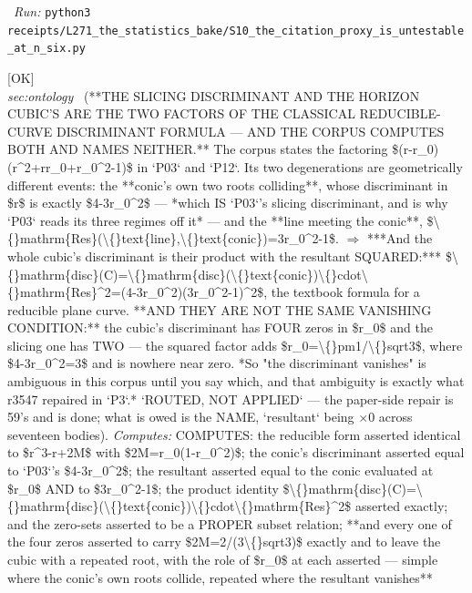 \begin{description}
\ \emph{Run:} \texttt{python3 receipts/L271\_the\_statistics\_bake/S10\_the\_citation\_proxy\_is\_untestable\_at\_n\_six.py}
\item[\label{rcpt:AG1_the_two_discriminants_are_a_resultant_apart}\texttt{AG1\_the\_two\_discriminants\_are\_a\_resultant\_apart}]\hfill\textsf{[OK]}\\
\textit{sec:ontology} \ (**THE SLICING DISCRIMINANT AND THE HORIZON CUBIC'S ARE THE TWO FACTORS OF THE CLASSICAL REDUCIBLE-CURVE DISCRIMINANT FORMULA --- AND THE CORPUS COMPUTES BOTH AND NAMES NEITHER.** The corpus states the factoring \$(r-r\_0)(r\textasciicircum{}2+rr\_0+r\_0\textasciicircum{}2-1)\$ in `P03` and `P12`. Its two degenerations are geometrically different events: the **conic's own two roots colliding**, whose discriminant in \$r\$ is exactly \$4-3r\_0\textasciicircum{}2\$ --- *which IS `P03`'s slicing discriminant, and is why `P03` reads its three regimes off it* --- and the **line meeting the conic**, \$\textbackslash\{\}mathrm\{Res\}(\textbackslash\{\}text\{line\},\textbackslash\{\}text\{conic\})=3r\_0\textasciicircum{}2-1\$. \ensuremath{\Rightarrow} ***And the whole cubic's discriminant is their product with the resultant SQUARED:*** \$\textbackslash\{\}mathrm\{disc\}(C)=\textbackslash\{\}mathrm\{disc\}(\textbackslash\{\}text\{conic\})\textbackslash\{\}cdot\textbackslash\{\}mathrm\{Res\}\textasciicircum{}2=(4-3r\_0\textasciicircum{}2)(3r\_0\textasciicircum{}2-1)\textasciicircum{}2\$, the textbook formula for a reducible plane curve.  **AND THEY ARE NOT THE SAME VANISHING CONDITION:** the cubic's discriminant has FOUR zeros in \$r\_0\$ and the slicing one has TWO --- the squared factor adds \$r\_0=\textbackslash\{\}pm1/\textbackslash\{\}sqrt3\$, where \$4-3r\_0\textasciicircum{}2=3\$ and is nowhere near zero. *So "the discriminant vanishes" is ambiguous in this corpus until you say which, and that ambiguity is exactly what r3547 repaired in `P3`.*  `ROUTED, NOT APPLIED` --- the paper-side repair is 59's and is done; what is owed is the NAME, `resultant` being \ensuremath{\times}0 across seventeen bodies). 
\emph{Computes:} COMPUTES: the reducible form asserted identical to \$r\textasciicircum{}3-r+2M\$ with \$2M=r\_0(1-r\_0\textasciicircum{}2)\$; the conic's discriminant asserted equal to `P03`'s \$4-3r\_0\textasciicircum{}2\$; the resultant asserted equal to the conic evaluated at \$r\_0\$ AND to \$3r\_0\textasciicircum{}2-1\$; the product identity \$\textbackslash\{\}mathrm\{disc\}(C)=\textbackslash\{\}mathrm\{disc\}(\textbackslash\{\}text\{conic\})\textbackslash\{\}cdot\textbackslash\{\}mathrm\{Res\}\textasciicircum{}2\$ asserted exactly; and the zero-sets asserted to be a PROPER subset relation; **and every one of the four zeros asserted to carry \$\textbar{}2M\textbar{}=2/(3\textbackslash\{\}sqrt3)\$ exactly and to leave the cubic with a repeated root, with the role of \$r\_0\$ at each asserted --- simple where the conic's own roots collide, repeated where the resultant vanishes**

\end{description}
